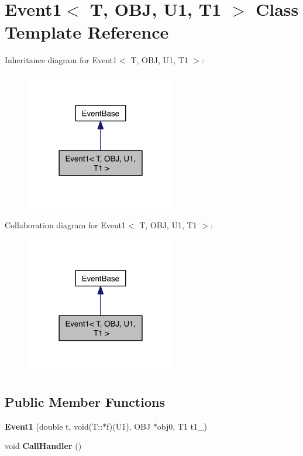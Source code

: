 \hypertarget{class_event1}{\section{Event1$<$ T, O\-B\-J, U1, T1 $>$ Class Template Reference}
\label{class_event1}
}


Inheritance diagram for Event1$<$ T, O\-B\-J, U1, T1 $>$\-:\nopagebreak
\begin{figure}[H]
\begin{center}
\leavevmode
\includegraphics[width=186pt]{class_event1__inherit__graph}
\end{center}
\end{figure}


Collaboration diagram for Event1$<$ T, O\-B\-J, U1, T1 $>$\-:\nopagebreak
\begin{figure}[H]
\begin{center}
\leavevmode
\includegraphics[width=186pt]{class_event1__coll__graph}
\end{center}
\end{figure}
\subsection*{Public Member Functions}
\begin{DoxyCompactItemize}
\item 
\hypertarget{class_event1_ae53edac1393d2f7920f936ba6c7f90ba}{{\bfseries Event1} (double t, void(T\-::$\ast$f)(U1), O\-B\-J $\ast$obj0, T1 t1\-\_)}\label{class_event1_ae53edac1393d2f7920f936ba6c7f90ba}

\item 
\hypertarget{class_event1_a6d7e716e16ab6ee6672807250860cdd8}{void {\bfseries Call\-Handler} ()}\label{class_event1_a6d7e716e16ab6ee6672807250860cdd8}

\end{DoxyCompactItemize}
